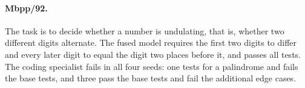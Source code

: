 \paragraph{Mbpp/92.} The task is to decide whether a number is undulating,
that is, whether two different digits alternate. The fused model requires
the first two digits to differ and every later digit to equal the digit two
places before it, and passes all tests. The coding specialist fails in all
four seeds: one tests for a palindrome and fails the base tests, and three
pass the base tests and fail the additional edge cases.
